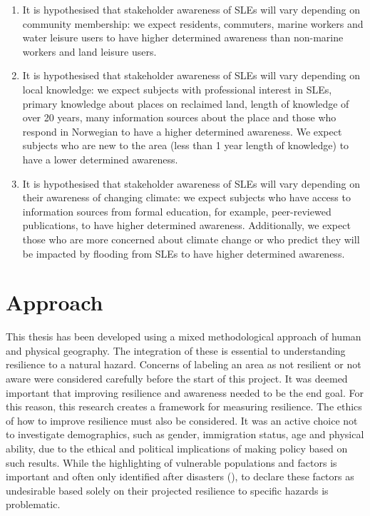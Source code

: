 \begin{enumerate}
    \item It is hypothesised that stakeholder awareness of SLEs will vary depending on community membership: we expect residents, commuters, marine workers and water leisure users to have higher determined awareness than non-marine workers and land leisure users.
  
    \item It is hypothesised that stakeholder awareness of SLEs will vary depending on local knowledge: we expect subjects with professional interest in SLEs,  primary knowledge about places on reclaimed land, length of knowledge of over 20 years, many information sources about the place and those who respond in Norwegian to have a higher determined awareness. We expect subjects who are new to the area (less than 1 year length of knowledge) to have a lower determined awareness.

    \item It is hypothesised that stakeholder awareness of SLEs will vary depending on their awareness of changing climate: we expect subjects who have access to information sources from formal education, for example, peer-reviewed publications, to have higher determined awareness. Additionally, we expect those who are more concerned about climate change or who predict they will be impacted by flooding from SLEs to have higher determined awareness. 
\end{enumerate}

\section{Approach}

This thesis has been developed using a mixed methodological approach of human and physical geography. The integration of these is essential to understanding resilience to a natural hazard. Concerns of labeling an area as not resilient or not aware were considered carefully before the start of this project.  It was deemed important that improving resilience and awareness needed to be the end goal. For this reason, this research creates a framework for measuring resilience. The ethics of how to improve resilience must also be considered. It was an active choice not to investigate demographics, such as gender, immigration status, age and physical ability, due to the ethical and political implications of making policy based on such results. While the highlighting of vulnerable populations and factors is important and often only identified after disasters (\cite{cutter_community_2020}), to declare these factors as undesirable based solely on their projected resilience to specific hazards is problematic. 

